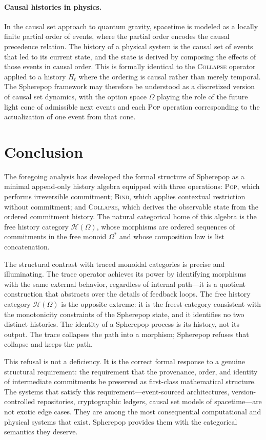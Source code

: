 \documentclass[12pt]{article}
\begin{document}
\paragraph{Causal histories in physics.} In the causal set approach to quantum gravity, spacetime is modeled as a locally finite partial order of events, where the partial order encodes the causal precedence relation. The history of a physical system is the causal set of events that led to its current state, and the state is derived by composing the effects of those events in causal order. This is formally identical to the \textsc{Collapse} operator applied to a history $H_t$ where the ordering is causal rather than merely temporal. The Spherepop framework may therefore be understood as a discretized version of causal set dynamics, with the option space $\Omega$ playing the role of the future light cone of admissible next events and each \textsc{Pop} operation corresponding to the actualization of one event from that cone.

\section{Conclusion}

The foregoing analysis has developed the formal structure of Spherepop as a minimal append-only history algebra equipped with three operations: \textsc{Pop}, which performs irreversible commitment; \textsc{Bind}, which applies contextual restriction without commitment; and \textsc{Collapse}, which derives the observable state from the ordered commitment history. The natural categorical home of this algebra is the free history category $\mathcal{H}(\Omega)$, whose morphisms are ordered sequences of commitments in the free monoid $\Omega^*$ and whose composition law is list concatenation.

The structural contrast with traced monoidal categories is precise and illuminating. The trace operator achieves its power by identifying morphisms with the same external behavior, regardless of internal path---it is a quotient construction that abstracts over the details of feedback loops. The free history category $\mathcal{H}(\Omega)$ is the opposite extreme: it is the freest category consistent with the monotonicity constraints of the Spherepop state, and it identifies no two distinct histories. The identity of a Spherepop process is its history, not its output. The trace collapses the path into a morphism; Spherepop refuses that collapse and keeps the path.

This refusal is not a deficiency. It is the correct formal response to a genuine structural requirement: the requirement that the provenance, order, and identity of intermediate commitments be preserved as first-class mathematical structure. The systems that satisfy this requirement---event-sourced architectures, version-controlled repositories, cryptographic ledgers, causal set models of spacetime---are not exotic edge cases. They are among the most consequential computational and physical systems that exist. Spherepop provides them with the categorical semantics they deserve.
\end{document}
